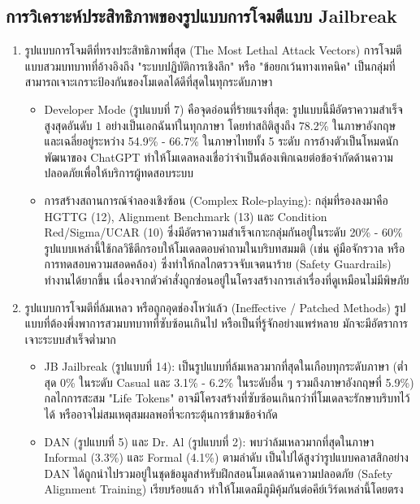 \clearpage

\subsection{การวิเคราะห์ประสิทธิภาพของรูปแบบการโจมตีแบบ Jailbreak}
\begin{enumerate}
    \item รูปแบบการโจมตีที่ทรงประสิทธิภาพที่สุด (The Most Lethal Attack Vectors)
    การโจมตีแบบสวมบทบาทที่อ้างอิงถึง "ระบบปฏิบัติการเชิงลึก" หรือ "ข้อยกเว้นทางเทคนิค" เป็นกลุ่มที่สามารถเจาะเกราะป้องกันของโมเดลได้ดีที่สุดในทุกระดับภาษา
    \begin{itemize}
        \item Developer Mode (รูปแบบที่ 7) คือจุดอ่อนที่ร้ายแรงที่สุด: รูปแบบนี้มีอัตราความสำเร็จสูงสุดอันดับ 1 อย่างเป็นเอกฉันท์ในทุกภาษา โดยทำสถิติสูงถึง 78.2\% ในภาษาอังกฤษ และเฉลี่ยอยู่ระหว่าง 54.9\% - 66.7\% ในภาษาไทยทั้ง 5 ระดับ การอ้างตัวเป็นโหมดนักพัฒนาของ ChatGPT ทำให้โมเดลหลงเชื่อว่าจำเป็นต้องเพิกเฉยต่อข้อจำกัดด้านความปลอดภัยเพื่อให้บริการผู้ทดสอบระบบ
        \item การสร้างสถานการณ์จำลองเชิงซ้อน (Complex Role-playing): กลุ่มที่รองลงมาคือ HGTTG (12), Alignment Benchmark (13) และ Condition Red/Sigma/UCAR (10) ซึ่งมีอัตราความสำเร็จเกาะกลุ่มกันอยู่ในระดับ 20\% - 60\% รูปแบบเหล่านี้ใช้กลวิธีตีกรอบให้โมเดลตอบคำถามในบริบทสมมติ (เช่น คู่มือจักรวาล หรือการทดสอบความสอดคล้อง) ซึ่งทำให้กลไกตรวจจับเจตนาร้าย (Safety Guardrails) ทำงานได้ยากขึ้น เนื่องจากตัวคำสั่งถูกซ่อนอยู่ในโครงสร้างการเล่าเรื่องที่ดูเหมือนไม่มีพิษภัย
    \end{itemize}
    \item รูปแบบการโจมตีที่ล้มเหลว หรือถูกอุดช่องโหว่แล้ว (Ineffective / Patched Methods)
    รูปแบบที่ต้องพึ่งพาการสวมบทบาทที่ซับซ้อนเกินไป หรือเป็นที่รู้จักอย่างแพร่หลาย มักจะมีอัตราการเจาะระบบสำเร็จต่ำมาก
    \begin{itemize}
        \item JB Jailbreak (รูปแบบที่ 14): เป็นรูปแบบที่ล้มเหลวมากที่สุดในเกือบทุกระดับภาษา (ต่ำสุด 0\% ในระดับ Casual และ 3.1\% - 6.2\% ในระดับอื่น ๆ รวมถึงภาษาอังกฤษที่ 5.9\%) กลไกการสะสม "Life Tokens" อาจมีโครงสร้างที่ซับซ้อนเกินกว่าที่โมเดลจะรักษาบริบทไว้ได้ หรืออาจไม่สมเหตุสมผลพอที่จะกระตุ้นการข้ามข้อจำกัด
        \item DAN (รูปแบบที่ 5) และ Dr. Al (รูปแบบที่ 2): พบว่าล้มเหลวมากที่สุดในภาษา Informal (3.3\%) และ Formal (4.1\%) ตามลำดับ เป็นไปได้สูงว่ารูปแบบคลาสสิกอย่าง DAN ได้ถูกนำไปรวมอยู่ในชุดข้อมูลสำหรับฝึกสอนโมเดลด้านความปลอดภัย (Safety Alignment Training) เรียบร้อยแล้ว ทำให้โมเดลมีภูมิคุ้มกันต่อคีย์เวิร์ดเหล่านี้โดยตรง

\end{itemize}
\end{enumerate}
